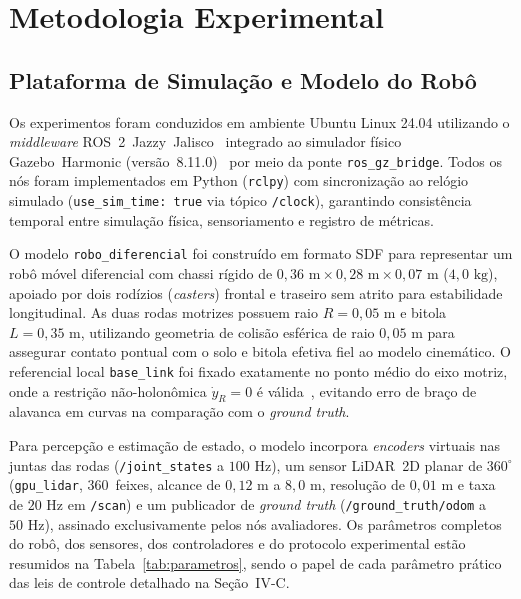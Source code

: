 \section{Metodologia Experimental}

\subsection{Plataforma de Simulação e Modelo do Robô}

Os experimentos foram conduzidos em ambiente Ubuntu Linux 24.04 utilizando o \textit{middleware} ROS~2~Jazzy~Jalisco~\cite{ros2jazzy} integrado ao simulador físico Gazebo~Harmonic (versão~8.11.0)~\cite{gazeboharmonic} por meio da ponte \texttt{ros\_gz\_bridge}. Todos os nós foram implementados em Python (\texttt{rclpy}) com sincronização ao relógio simulado (\texttt{use\_sim\_time: true} via tópico \texttt{/clock}), garantindo consistência temporal entre simulação física, sensoriamento e registro de métricas.

O modelo \texttt{robo\_diferencial} foi construído em formato SDF para representar um robô móvel diferencial com chassi rígido de $0{,}36\text{ m} \times 0{,}28\text{ m} \times 0{,}07\text{ m}$ ($4{,}0\text{ kg}$), apoiado por dois rodízios (\textit{casters}) frontal e traseiro sem atrito para estabilidade longitudinal. As duas rodas motrizes possuem raio $R = 0{,}05\text{ m}$ e bitola $L = 0{,}35\text{ m}$, utilizando geometria de colisão esférica de raio $0{,}05\text{ m}$ para assegurar contato pontual com o solo e bitola efetiva fiel ao modelo cinemático. O referencial local \texttt{base\_link} foi fixado exatamente no ponto médio do eixo motriz, onde a restrição não-holonômica $\dot{y}_R = 0$ é válida~\cite{siegwart2004}, evitando erro de braço de alavanca em curvas na comparação com o \textit{ground truth}.

Para percepção e estimação de estado, o modelo incorpora \textit{encoders} virtuais nas juntas das rodas (\texttt{/joint\_states} a $100\text{ Hz}$), um sensor LiDAR~2D planar de $360^\circ$ (\texttt{gpu\_lidar}, $360$~feixes, alcance de $0{,}12\text{ m}$ a $8{,}0\text{ m}$, resolução de $0{,}01\text{ m}$ e taxa de $20\text{ Hz}$ em \texttt{/scan}) e um publicador de \textit{ground truth} (\texttt{/ground\_truth/odom} a $50\text{ Hz}$), assinado exclusivamente pelos nós avaliadores. Os parâmetros completos do robô, dos sensores, dos controladores e do protocolo experimental estão resumidos na Tabela~\ref{tab:parametros}, sendo o papel de cada parâmetro prático das leis de controle detalhado na Seção~IV-C.

